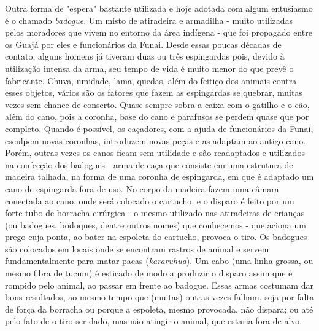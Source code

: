 Outra forma de "espera" bastante utilizada e hoje adotada com algum
entusiasmo é o chamado \emph{badogue}. Um misto de atiradeira e
armadilha - muito utilizadas pelos moradores que vivem no entorno da
área indígena - que foi propagado entre os Guajá por eles e funcionários
da Funai. Desde essas poucas décadas de contato, alguns homens já
tiveram duas ou três espingardas pois, devido à utilização intensa da
arma, seu tempo de vida é muito menor do que prevê o fabricante. Chuva,
umidade, lama, quedas, além do feitiço dos animais contra esses objetos,
vários são os fatores que fazem as espingardas se quebrar, muitas vezes
sem chance de conserto. Quase sempre sobra a caixa com o gatilho e o
cão, além do cano, pois a coronha, base do cano e parafusos se perdem
quase que por completo. Quando é possível, os caçadores, com a ajuda de
funcionários da Funai, esculpem novas coronhas, introduzem novas peças e
as adaptam ao antigo cano. Porém, outras vezes os canos ficam sem
utilidade e são readaptados e utilizados na confecção dos badogues -
arma de caça que consiste em uma estrutura de madeira talhada, na forma
de uma coronha de espingarda, em que é adaptado um cano de espingarda
fora de uso. No corpo da madeira fazem uma câmara conectada ao cano,
onde será colocado o cartucho, e o disparo é feito por um forte tubo de
borracha cirúrgica - o mesmo utilizado nas atiradeiras de crianças (ou
badogues, bodoques, dentre outros nomes) que conhecemos - que aciona um
prego cuja ponta, ao bater na espoleta do cartucho, provoca o tiro. Os
badogues são colocados em locais onde se encontram rastros de animal e
servem fundamentalmente para matar pacas (\emph{kararuhua}). Um cabo
(uma linha grossa, ou mesmo fibra de tucum) é esticado de modo a
produzir o disparo assim que é rompido pelo animal, ao passar em frente
ao badogue. Essas armas costumam dar bons resultados, ao mesmo tempo que
(muitas) outras vezes falham, seja por falta de força da borracha ou
porque a espoleta, mesmo provocada, não dispara; ou até pelo fato de o
tiro ser dado, mas não atingir o animal, que estaria fora de alvo.

